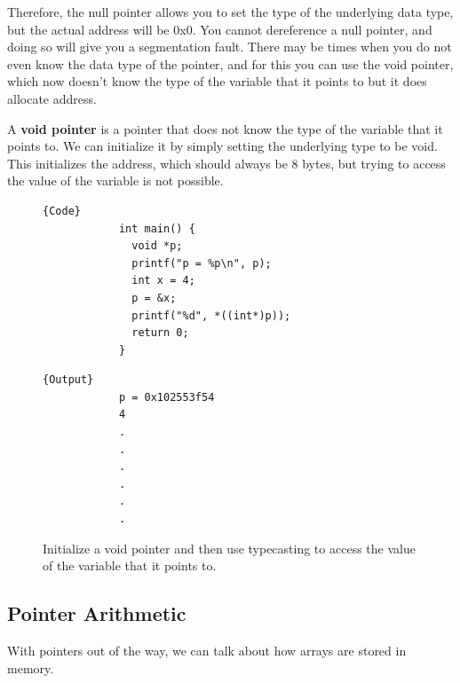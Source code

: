 \documentclass{article}
\begin{document}
      Therefore, the null pointer allows you to set the type of the underlying data type, but the actual address will be 0x0. You cannot dereference a null pointer, and doing so will give you a segmentation fault. There may be times when you do not even know the data type of the pointer, and for this you can use the void pointer, which now doesn't know the type of the variable that it points to but it does allocate address. 

      \begin{definition}
        A \textbf{void pointer} is a pointer that does not know the type of the variable that it points to. We can initialize it by simply setting the underlying type to be void. This initializes the address, which should always be 8 bytes, but trying to access the value of the variable is not possible. 
        \begin{figure}[H]
          \centering 
          \noindent\begin{minipage}{.5\textwidth}
          \begin{lstlisting}[]{Code}
            int main() { 
              void *p; 
              printf("p = %p\n", p); 
              int x = 4; 
              p = &x; 
              printf("%d", *((int*)p));
              return 0; 
            }
          \end{lstlisting}
          \end{minipage}
          \hfill
          \begin{minipage}{.49\textwidth}
          \begin{lstlisting}[]{Output}
            p = 0x102553f54
            4 
            .
            .
            .
            .
            .
            .
          \end{lstlisting}
          \end{minipage}
          \caption{Initialize a void pointer and then use typecasting to access the value of the variable that it points to. } 
          \label{fig:initialize_void_pointer}
        \end{figure}
      \end{definition}

  \subsection{Pointer Arithmetic} 

    With pointers out of the way, we can talk about how arrays are stored in memory. 
\end{document}
